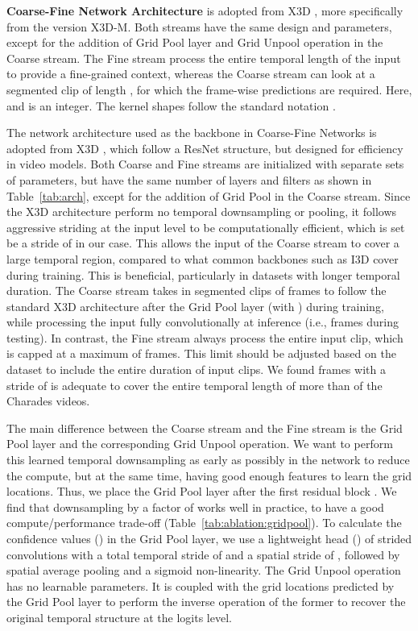 \documentclass[final]{cvpr}
\newcommand{\tref}[1]{Table~\ref{#1}}
\begin{document}
\begin{table}[t]
	\vspace{3mm}
	\caption{\textbf{Coarse-Fine Network Architecture} is adopted from X3D \cite{feichtenhofer2020x3d}, more specifically from the version X3D-M. Both streams have the same design and parameters, except for the addition of Grid Pool layer and Grid Unpool operation in the Coarse stream. The Fine stream process the entire temporal length of the input  to provide a fine-grained context, whereas the Coarse stream can look at a segmented clip of length , for which the frame-wise predictions are required. Here,  and  is an integer. The kernel shapes follow the standard notation .}
	\label{tab:arch}
	\vspace{-5mm}
\end{table}

The network architecture used as the backbone in Coarse-Fine Networks is adopted from X3D \cite{feichtenhofer2020x3d}, which follow a ResNet \cite{he2016deep} structure, but designed for efficiency in video models. Both Coarse and Fine streams are initialized with separate sets of parameters, but have the same number of layers and filters as shown in \tref{tab:arch}, except for the addition of Grid Pool in the Coarse stream. Since the X3D architecture perform no temporal downsampling or pooling, it follows aggressive striding at the input level to be computationally efficient, which is set be a stride of  in our case. This allows the input of the Coarse stream to cover a large temporal region, compared to what common backbones such as I3D \cite{carreira2017quo} cover during training. This is beneficial, particularly in datasets with longer temporal duration. The Coarse stream takes in segmented clips of  frames to follow the standard X3D architecture after the Grid Pool layer (with ) during training, while processing the input fully convolutionally at inference (i.e.,  frames during testing). In contrast, the Fine stream always process the entire input clip, which is capped at a maximum of  frames. This limit should be adjusted based on the dataset to include the entire duration of input clips. We found  frames with a stride of  is adequate to cover the entire temporal length of more than  of the Charades \cite{sigurdsson2016hollywood} videos.

The main difference between the Coarse stream and the Fine stream is the Grid Pool layer and the corresponding Grid Unpool operation. We want to perform this learned temporal downsampling as early as possibly in the network to reduce the compute, but at the same time, having good enough features to learn the grid locations. Thus, we place the Grid Pool layer after the first residual block . We find that downsampling by a factor of  works well in practice, to have a good compute/performance trade-off (\tref{tab:ablation:gridpool}). To calculate the confidence values () in the Grid Pool layer, we use a lightweight head () of  strided convolutions with a total temporal stride of  and a spatial stride of , followed by spatial average pooling and a sigmoid non-linearity. The Grid Unpool operation has no learnable parameters. It is coupled with the grid locations predicted by the Grid Pool layer to perform the inverse operation of the former to recover the original temporal structure at the logits level.
\end{document}
